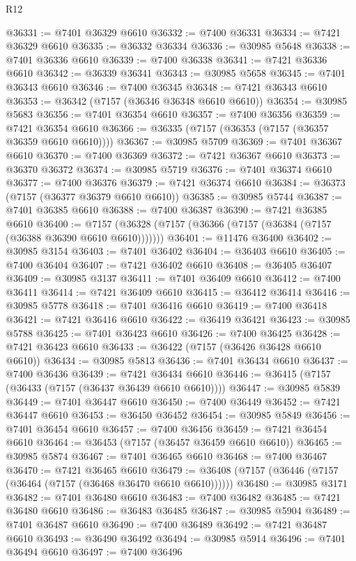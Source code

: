 \begin{lexlean}{R12}
\begin{coremodule}
@36331 := @7401 @36329 @6610
@36332 := @7400 @36331
@36334 := @7421 @36329 @6610
@36335 := @36332 @36334
@36336 := @30985 @5648
@36338 := @7401 @36336 @6610
@36339 := @7400 @36338
@36341 := @7421 @36336 @6610
@36342 := @36339 @36341
@36343 := @30985 @5658
@36345 := @7401 @36343 @6610
@36346 := @7400 @36345
@36348 := @7421 @36343 @6610
@36353 := @36342 (@7157 (@36346 @36348 @6610 @6610))
@36354 := @30985 @5683
@36356 := @7401 @36354 @6610
@36357 := @7400 @36356
@36359 := @7421 @36354 @6610
@36366 := @36335 (@7157 (@36353 (@7157 (@36357 @36359 @6610 @6610))))
@36367 := @30985 @5709
@36369 := @7401 @36367 @6610
@36370 := @7400 @36369
@36372 := @7421 @36367 @6610
@36373 := @36370 @36372
@36374 := @30985 @5719
@36376 := @7401 @36374 @6610
@36377 := @7400 @36376
@36379 := @7421 @36374 @6610
@36384 := @36373 (@7157 (@36377 @36379 @6610 @6610))
@36385 := @30985 @5744
@36387 := @7401 @36385 @6610
@36388 := @7400 @36387
@36390 := @7421 @36385 @6610
@36400 := @7157 (@36328 (@7157 (@36366 (@7157 (@36384 (@7157 (@36388 @36390 @6610 @6610)))))))
@36401 := @11476 @36400
@36402 := @30985 @3154
@36403 := @7401 @36402
@36404 := @36403 @6610
@36405 := @7400 @36404
@36407 := @7421 @36402 @6610
@36408 := @36405 @36407
@36409 := @30985 @3137
@36411 := @7401 @36409 @6610
@36412 := @7400 @36411
@36414 := @7421 @36409 @6610
@36415 := @36412 @36414
@36416 := @30985 @5778
@36418 := @7401 @36416 @6610
@36419 := @7400 @36418
@36421 := @7421 @36416 @6610
@36422 := @36419 @36421
@36423 := @30985 @5788
@36425 := @7401 @36423 @6610
@36426 := @7400 @36425
@36428 := @7421 @36423 @6610
@36433 := @36422 (@7157 (@36426 @36428 @6610 @6610))
@36434 := @30985 @5813
@36436 := @7401 @36434 @6610
@36437 := @7400 @36436
@36439 := @7421 @36434 @6610
@36446 := @36415 (@7157 (@36433 (@7157 (@36437 @36439 @6610 @6610))))
@36447 := @30985 @5839
@36449 := @7401 @36447 @6610
@36450 := @7400 @36449
@36452 := @7421 @36447 @6610
@36453 := @36450 @36452
@36454 := @30985 @5849
@36456 := @7401 @36454 @6610
@36457 := @7400 @36456
@36459 := @7421 @36454 @6610
@36464 := @36453 (@7157 (@36457 @36459 @6610 @6610))
@36465 := @30985 @5874
@36467 := @7401 @36465 @6610
@36468 := @7400 @36467
@36470 := @7421 @36465 @6610
@36479 := @36408 (@7157 (@36446 (@7157 (@36464 (@7157 (@36468 @36470 @6610 @6610))))))
@36480 := @30985 @3171
@36482 := @7401 @36480 @6610
@36483 := @7400 @36482
@36485 := @7421 @36480 @6610
@36486 := @36483 @36485
@36487 := @30985 @5904
@36489 := @7401 @36487 @6610
@36490 := @7400 @36489
@36492 := @7421 @36487 @6610
@36493 := @36490 @36492
@36494 := @30985 @5914
@36496 := @7401 @36494 @6610
@36497 := @7400 @36496

\end{coremodule}
\end{lexlean}
